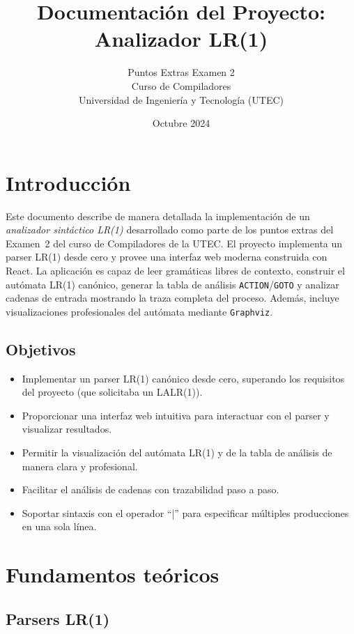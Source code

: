 \documentclass[12pt,a4paper]{article}
\title{Documentación del Proyecto: Analizador LR(1)}
\author{Puntos Extras Examen 2 \\ Curso de Compiladores \\ Universidad de Ingeniería y Tecnología (UTEC)}
\date{Octubre 2024}
\begin{document}
\maketitle
\tableofcontents
\newpage

\section{Introducción}

Este documento describe de manera detallada la implementación de un \emph{analizador sintáctico LR(1)} desarrollado como parte de los puntos extras del Examen~2 del curso de Compiladores de la UTEC.  El proyecto implementa un parser LR(1) desde cero y provee una interfaz web moderna construida con React.  La aplicación es capaz de leer gramáticas libres de contexto, construir el autómata LR(1) canónico, generar la tabla de análisis \texttt{ACTION}/\texttt{GOTO} y analizar cadenas de entrada mostrando la traza completa del proceso.  Además, incluye visualizaciones profesionales del autómata mediante \texttt{Graphviz}.

\subsection{Objetivos}
\begin{itemize}
  \item Implementar un parser LR(1) canónico desde cero, superando los requisitos del proyecto (que solicitaba un LALR(1)).
  \item Proporcionar una interfaz web intuitiva para interactuar con el parser y visualizar resultados.
  \item Permitir la visualización del autómata LR(1) y de la tabla de análisis de manera clara y profesional.
  \item Facilitar el análisis de cadenas con trazabilidad paso a paso.
  \item Soportar sintaxis con el operador ``|'' para especificar múltiples producciones en una sola línea.
\end{itemize}

\section{Fundamentos teóricos}

\subsection{Parsers LR(1)}
\end{document}
